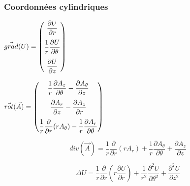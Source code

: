 \documentclass[
10pt,
aspectratio=169,
]{beamer}
\begin{document}
\begin{frame}
\frametitle{Coordonnées cylindriques}

\center\begin{minipage}[t]{0.35\textwidth}
$\vec{grad}(U)=\begin{pmatrix}
\dfrac{\partial U}{\partial r} \vspace{0.25cm}\\
\dfrac{1}{r}\dfrac{\partial U}{\partial \theta} \vspace{0.25cm}\\
\dfrac{\partial U}{\partial z}
\end{pmatrix}$
\end{minipage}
\hfill
\begin{minipage}[t]{0.55\textwidth}

$\vec{rot}(\vec{A})=\begin{pmatrix}
\dfrac{1}{r}\dfrac{\partial A_z}{\partial \theta}-\dfrac{\partial A_\theta}{\partial z} \vspace{0.25cm}\\
\dfrac{\partial A_r}{\partial z}-\dfrac{\partial A_z}{\partial r}\vspace{0.25cm}\\
\dfrac{1}{r}\dfrac{\partial}{\partial r}(r A_\theta)-\dfrac{1}{r}\dfrac{\partial A_r}{\partial \theta}
\end{pmatrix}$

\end{minipage}

\vspace{0.5cm}
\[div(\vec{A})=\dfrac{1}{r}\dfrac{\partial}{\partial r}(r A_r)+\dfrac{1}{r}\dfrac{\partial A_\theta}{\partial \theta}+\dfrac{\partial A_z}{\partial z}\]

\vspace{0.5cm}
\[\Delta U=\dfrac{1}{r}\dfrac{\partial}{\partial r}(r \dfrac{\partial U}{\partial r})+\dfrac{1}{r^2}\dfrac{\partial^2 U}{\partial \theta^2}+\dfrac{\partial^2 U}{\partial z^2}\]

\end{frame}

\end{document}
